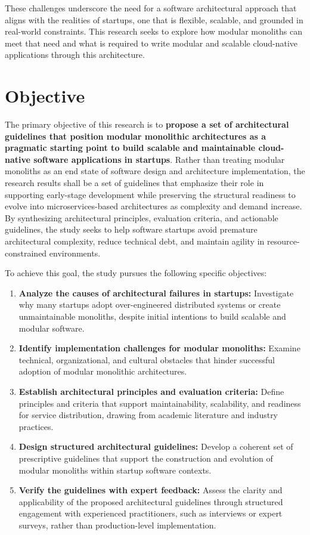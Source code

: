 These challenges underscore the need for a software architectural approach that aligns with the realities of startups, one that is flexible, scalable, and grounded in real-world constraints. This research seeks to explore how modular monoliths can meet that need and what is required to write modular and scalable cloud-native applications through this architecture.


\section{Objective}

The primary objective of this research is to \textbf{propose a set of architectural guidelines that position modular monolithic architectures as a pragmatic starting point to build scalable and maintainable cloud-native software applications in startups}. Rather than treating modular monoliths as an end state of software design and architecture implementation, the research results shall be a set of guidelines that emphasize their role in supporting early-stage development while preserving the structural readiness to evolve into microservices-based architectures as complexity and demand increase. By synthesizing architectural principles, evaluation criteria, and actionable guidelines, the study seeks to help software startups avoid premature architectural complexity, reduce technical debt, and maintain agility in resource-constrained environments.

To achieve this goal, the study pursues the following specific objectives:

\begin{enumerate}[itemsep=8pt,topsep=2pt]
\item \textbf{Analyze the causes of architectural failures in startups:} Investigate why many startups adopt over-engineered distributed systems or create unmaintainable monoliths, despite initial intentions to build scalable and modular software.

\item \textbf{Identify implementation challenges for modular monoliths:} Examine technical, organizational, and cultural obstacles that hinder successful adoption of modular monolithic architectures.

\item \textbf{Establish architectural principles and evaluation criteria:} Define principles and criteria that support maintainability, scalability, and readiness for service distribution, drawing from academic literature and industry practices.

\item \textbf{Design structured architectural guidelines:} Develop a coherent set of prescriptive guidelines that support the construction and evolution of modular monoliths within startup software contexts.

\item \textbf{Verify the guidelines with expert feedback:} Assess the clarity and applicability of the proposed architectural guidelines through structured engagement with experienced practitioners, such as interviews or expert surveys, rather than production-level implementation.
\end{enumerate}

